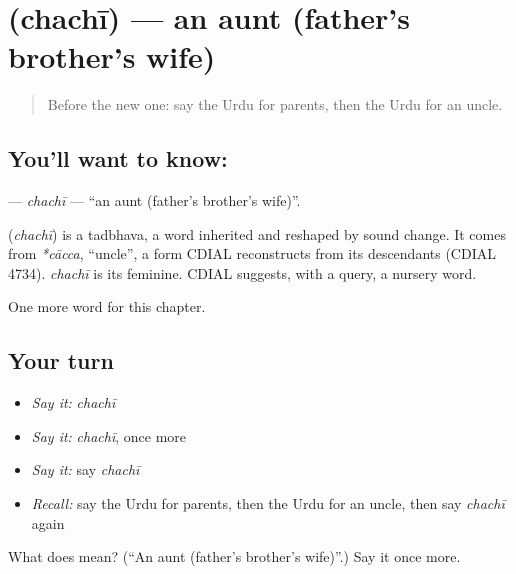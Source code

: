 \section[\texorpdfstring{\ur{چچی} (chachī)}{چچی (chachī)}]{ (chachī) — an aunt (father's brother's wife)}

\label{lesson:UR-C170-chachi}



\begin{quote}
Before the new one: say the Urdu for parents, then the Urdu for an uncle.
\end{quote}

\subsection*{You'll want to know: }
\textbf{} — \emph{chachī} — \textquotedblleft{}an aunt (father's brother's wife)\textquotedblright{}.

\begin{cousinweb}
\textbf{} (\emph{chachī}) is a tadbhava, a word inherited and reshaped by sound change. It comes from \emph{*cācca}, \textquotedblleft{}uncle\textquotedblright{}, a form CDIAL reconstructs from its descendants (CDIAL 4734). \emph{chachī} is its feminine. CDIAL suggests, with a query, a nursery word.
\end{cousinweb}

\begin{grammarlens}[title={What you've built}]
One more word for this chapter.
\end{grammarlens}

\subsection*{Your turn}
\begin{itemize}
\raggedright
  \item \emph{Say it:} \emph{chachī}
  \item \emph{Say it:} \emph{chachī}, once more
  \item \emph{Say it:} say \emph{chachī}
  \item \emph{Recall:} say the Urdu for parents, then the Urdu for an uncle, then say \emph{chachī} again
\end{itemize}

\begin{tcolorbox}[breakable,colback=teal!4,colframe=teal!35!black,title={Before you move on}]
What does  mean? (\textquotedblleft{}An aunt (father's brother's wife)\textquotedblright{}.) Say it once more.
\end{tcolorbox}
